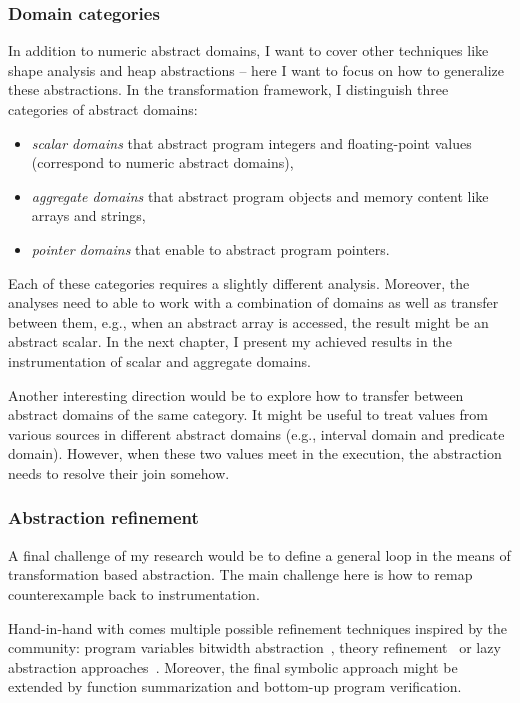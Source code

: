 \subsubsection{ Domain categories }

In addition to numeric abstract domains, I want to cover other techniques like
shape analysis and heap abstractions -- here I want to focus on how to
generalize these abstractions. In the transformation framework, I distinguish
three categories of abstract domains:

\begin{itemize}
    \item \emph{scalar domains} that abstract program integers and floating-point values (correspond to numeric abstract domains),
    \item \emph{aggregate domains} that abstract program objects and memory content like arrays and strings,

    \item \emph{pointer domains} that enable to abstract program pointers.
\end{itemize}

\noindent
Each of these categories requires a slightly different analysis. Moreover,  the
analyses need to able to work with a combination of domains as well as transfer
between them, e.g., when an abstract array is accessed, the result might
be an abstract scalar.  In the next chapter, I present my achieved results in
the instrumentation of scalar and aggregate domains.

Another interesting direction would be to explore how to transfer between
abstract domains of the same category. It might be useful to treat values from
various sources in different abstract domains (e.g., interval domain and
predicate domain). However, when these two values meet in the execution, the
abstraction needs to resolve their join somehow.

\subsubsection{Abstraction refinement}


A final challenge of my research would be to define a general \cegar loop in the
means of transformation based abstraction. The main challenge here is how to
remap counterexample back to instrumentation.

Hand-in-hand with \cegar comes multiple possible refinement techniques inspired
by the \smt community: program variables bitwidth
abstraction~\cite{Jonavs2018}, theory refinement~\cite{Hyvarinen2017} or lazy
abstraction approaches~\cite{Henzinger2002}. Moreover, the final symbolic
approach might be extended by function summarization and bottom-up program
verification.

